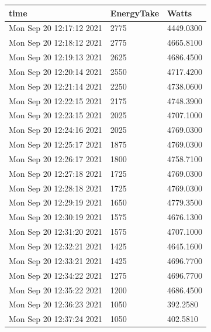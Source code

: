 \begin{longtable}{|l|l|l|}\label{table:hpwh_vacation_hybrid}

time & EnergyTake & Watts  \\ \hline

Mon Sep 20 12:17:12 2021 &               2775 &       4449.0300 \\ \hline
Mon Sep 20 12:18:12 2021 &               2775 &       4665.8100 \\ \hline
Mon Sep 20 12:19:13 2021 &               2625 &       4686.4500 \\ \hline
Mon Sep 20 12:20:14 2021 &               2550 &       4717.4200 \\ \hline
Mon Sep 20 12:21:14 2021 &               2250 &       4738.0600 \\ \hline
Mon Sep 20 12:22:15 2021 &               2175 &       4748.3900 \\ \hline
Mon Sep 20 12:23:15 2021 &               2025 &       4707.1000 \\ \hline
Mon Sep 20 12:24:16 2021 &               2025 &       4769.0300 \\ \hline
Mon Sep 20 12:25:17 2021 &               1875 &       4769.0300 \\ \hline
Mon Sep 20 12:26:17 2021 &               1800 &       4758.7100 \\ \hline
Mon Sep 20 12:27:18 2021 &               1725 &       4769.0300 \\ \hline
Mon Sep 20 12:28:18 2021 &               1725 &       4769.0300 \\ \hline
Mon Sep 20 12:29:19 2021 &               1650 &       4779.3500 \\ \hline
Mon Sep 20 12:30:19 2021 &               1575 &       4676.1300 \\ \hline
Mon Sep 20 12:31:20 2021 &               1575 &       4707.1000 \\ \hline
Mon Sep 20 12:32:21 2021 &               1425 &       4645.1600 \\ \hline
Mon Sep 20 12:33:21 2021 &               1425 &       4696.7700 \\ \hline
Mon Sep 20 12:34:22 2021 &               1275 &       4696.7700 \\ \hline
Mon Sep 20 12:35:22 2021 &               1200 &       4686.4500 \\ \hline
Mon Sep 20 12:36:23 2021 &               1050 &        392.2580 \\ \hline
Mon Sep 20 12:37:24 2021 &               1050 &        402.5810 \\ \hline

\end{longtable}
